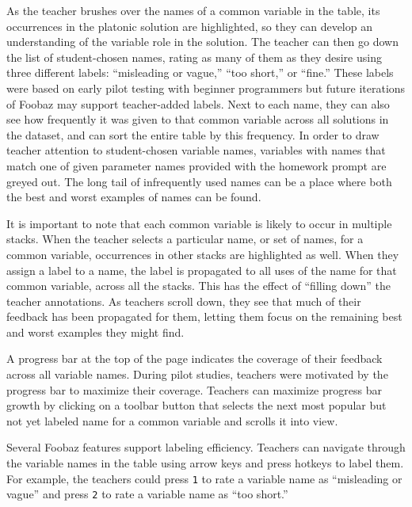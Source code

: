 As the teacher brushes over the names of a common variable in the table, its occurrences in the platonic solution are highlighted, so they can develop an understanding of the variable role in the solution. The teacher can then go down the list of student-chosen names, rating as many of them as they desire using three different labels: ``misleading or vague,'' ``too short,'' or ``fine.'' These labels were based on early pilot testing with beginner programmers but future iterations of Foobaz may support teacher-added labels. Next to each name, they can also see how frequently it was given to that common variable across all solutions in the dataset, and can sort the entire table by this frequency. In order to draw teacher attention to student-chosen variable names, variables with names that match one of given parameter names provided with the homework prompt are greyed out. The long tail of infrequently used names can be a place where both the best and worst examples of names can be found.

It is important to note that each common variable is likely to occur in multiple stacks. When the teacher selects a particular name, or set of names, for a common variable, occurrences in other stacks are highlighted as well. When they assign a label to a name, the label is propagated to all uses of the name for that common variable, across all the stacks. This has the effect of ``filling down'' the teacher annotations. As teachers scroll down, they see that much of their feedback has been propagated for them, letting them focus on the remaining best and worst examples they might find. 

A progress bar at the top of the page indicates the coverage of their feedback across all variable names. During pilot studies, teachers were motivated by the progress bar to maximize their coverage. Teachers can maximize progress bar growth by clicking on a toolbar button that selects the next most popular but not yet labeled name for a common variable and scrolls it into view. 

Several Foobaz features support labeling efficiency. Teachers can navigate through the variable names in the table using arrow keys and press hotkeys to label them. For example, the teachers could press \texttt{1} to rate a variable name as ``misleading or vague'' and press \texttt{2} to rate a variable name as ``too short.''

